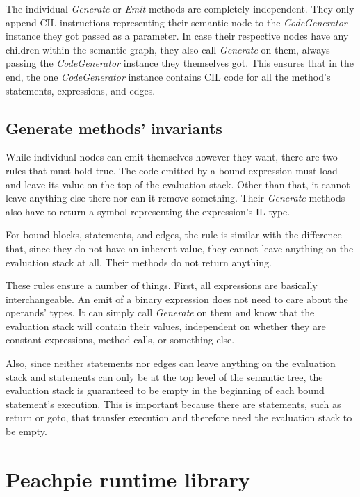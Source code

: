 The individual \emph{Generate} or \emph{Emit} methods are completely independent. They only append CIL instructions representing their semantic node to the \emph{CodeGenerator} instance they got passed as a parameter. In case their respective nodes have any children within the semantic graph, they also call \emph{Generate} on them, always passing the \emph{CodeGenerator} instance they themselves got. This ensures that in the end, the one \emph{CodeGenerator} instance contains CIL code for all the method’s statements, expressions, and edges.


\subsection{Generate methods’ invariants}

While individual nodes can emit themselves however they want, there are two rules that must hold true. The code emitted by a bound expression must load and leave its value on the top of the evaluation stack. Other than that, it cannot leave anything else there nor can it remove something. Their \emph{Generate} methods also have to return a symbol representing the expression’s IL type. 

For bound blocks, statements, and edges, the rule is similar with the difference that, since they do not have an inherent value, they cannot leave anything on the evaluation stack at all. Their methods do not return anything.

These rules ensure a number of things. First, all expressions are basically interchangeable. An emit of a binary expression does not need to care about the operands’ types. It can simply call \emph{Generate} on them and know that the evaluation stack will contain their values, independent on whether they are constant expressions, method calls, or something else.

Also, since neither statements nor edges can leave anything on the evaluation stack and statements can only be at the top level of the semantic tree, the evaluation stack is guaranteed to be empty in the beginning of each bound statement’s execution. This is important because there are statements, such as return or goto, that transfer execution and therefore need the evaluation stack to be empty.

\section{Peachpie runtime library}

